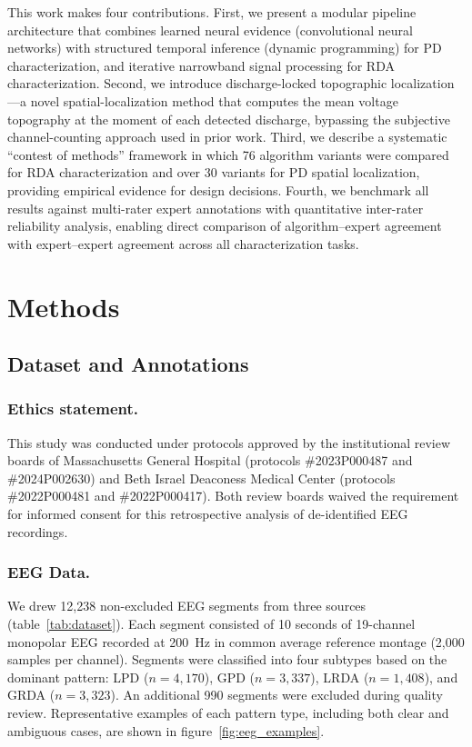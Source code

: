 \documentclass{iopjournal}
\begin{document}
This work makes four contributions. First, we present a modular pipeline architecture that combines learned neural evidence (convolutional neural networks) with structured temporal inference (dynamic programming) for PD characterization, and iterative narrowband signal processing for RDA characterization. Second, we introduce discharge-locked topographic localization---a novel spatial-localization method that computes the mean voltage topography at the moment of each detected discharge, bypassing the subjective channel-counting approach used in prior work. Third, we describe a systematic ``contest of methods'' framework in which 76 algorithm variants were compared for RDA characterization and over 30 variants for PD spatial localization, providing empirical evidence for design decisions. Fourth, we benchmark all results against multi-rater expert annotations with quantitative inter-rater reliability analysis, enabling direct comparison of algorithm--expert agreement with expert--expert agreement across all characterization tasks.

\section{Methods}
\label{sec:methods}

\subsection{Dataset and Annotations}
\label{sec:dataset}

\subsubsection{Ethics statement.}

This study was conducted under protocols approved by the institutional review boards of Massachusetts General Hospital (protocols \#2023P000487 and \#2024P002630) and Beth Israel Deaconess Medical Center (protocols \#2022P000481 and \#2022P000417). Both review boards waived the requirement for informed consent for this retrospective analysis of de-identified EEG recordings.

\subsubsection{EEG Data.}

We drew 12,238 non-excluded EEG segments from three sources (table~\ref{tab:dataset}). Each segment consisted of 10 seconds of 19-channel monopolar EEG recorded at 200~Hz in common average reference montage (2,000 samples per channel). Segments were classified into four subtypes based on the dominant pattern: LPD ($n = 4{,}170$), GPD ($n = 3{,}337$), LRDA ($n = 1{,}408$), and GRDA ($n = 3{,}323$). An additional 990 segments were excluded during quality review. Representative examples of each pattern type, including both clear and ambiguous cases, are shown in figure~\ref{fig:eeg_examples}.
\end{document}
